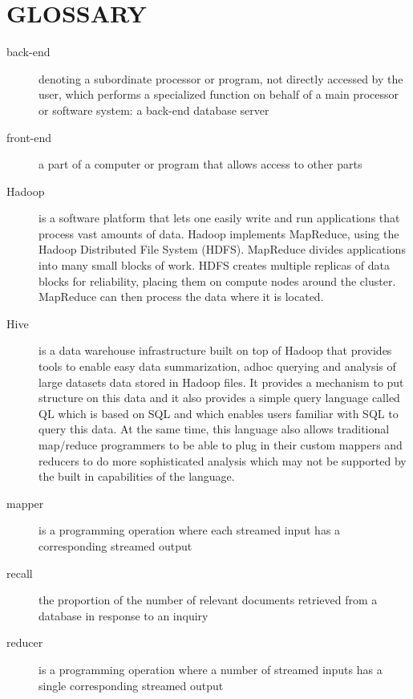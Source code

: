 \section*{GLOSSARY} %
\label{sec:glossary}
	\begin{description}
		
		\item[back-end]
denoting a subordinate processor or program, not directly accessed by the user, which performs a specialized function on behalf of a main processor or software system: a back-end database server

		\item[front-end]
a part of a computer or program that allows access to other parts

        \item[Hadoop]
is a software platform that lets one easily write and run applications that process vast amounts of data. Hadoop implements MapReduce, using the Hadoop Distributed File System (HDFS). MapReduce divides applications into many small blocks of work. HDFS creates multiple replicas of data blocks for reliability, placing them on compute nodes around the cluster. MapReduce can then process the data where it is located. \cite{hadoop_about}

         \item[Hive]
    is a data warehouse infrastructure built on top of Hadoop that provides tools to enable easy data summarization, adhoc querying and analysis of large datasets data stored in Hadoop files. It provides a mechanism to put structure on this data and it also provides a simple query language called QL which is based on SQL and which enables users familiar with SQL to query this data. At the same time, this language also allows traditional map/reduce programmers to be able to plug in their custom mappers and reducers to do more sophisticated analysis which may not be supported by the built in capabilities of the language. \cite{hive_about}
    
		\item[mapper]
is a programming operation where each streamed input has a corresponding streamed output

        \item[recall]
the proportion of the number of relevant documents retrieved from a database in response to an inquiry

		\item[reducer]
is a programming operation where a number of streamed inputs has a single corresponding streamed output
	\end{description}
